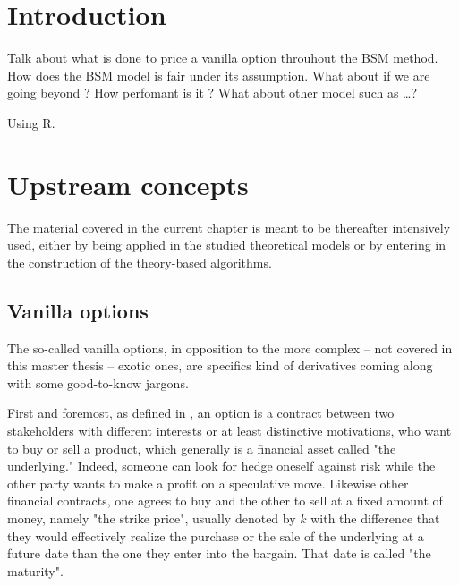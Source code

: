 \documentclass[12pt]{report}
\begin{document}

\tableofcontents{}



%
%
\chapter*{Introduction}
\label{cha:Introduction}

Talk about what is done to price a vanilla option throuhout the BSM method.
How does the BSM model is fair under its assumption. What about if we are going beyond ?
How perfomant is it ? 
What about other model such as \ldots ?

Using R. \cite{R}
%
%
\chapter{Upstream concepts}
\label{cha:upstream}



The material covered in the current chapter is meant to be thereafter intensively used, either by being applied in the studied theoretical models or by entering in the construction of the theory-based algorithms.

\section{Vanilla options}
\label{sec:upstream:vanilla}

The so-called vanilla options, in opposition to the more complex -- not covered in this master thesis -- exotic ones, are specifics kind of derivatives coming along with some good-to-know jargons. 

First and foremost,  as defined in \citet{hull}, an option is a contract between two stakeholders with different interests or at least distinctive motivations, who want to buy or sell a product, which generally is a financial asset called "the underlying." 
Indeed, someone can look for hedge oneself against risk while the other party wants to make a profit on a speculative move.
Likewise other financial contracts, one agrees to buy and the other to sell at a fixed amount of money, namely "the strike price", usually denoted by $k$ with the difference that they would effectively realize the purchase or the sale of the underlying at a future date than the one they enter into the bargain. That date is called "the maturity".
\end{document}
